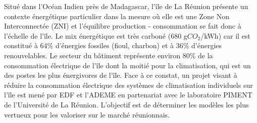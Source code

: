 {\normalsize
Situé dans l'Océan Indien près de Madagascar, l'île de La Réunion présente un contexte énergétique particulier dans la mesure où elle est une Zone Non Interconnectée (ZNI) et l'équilibre production - consommation se fait donc à l'échelle de l'île. Le mix énergétique est très carboné (680 g$\unit{CO_2}$/kWh) car il est constitué à 64\% d'énergies fossiles (fioul, charbon) et à 36\% d'énergies renouvelables. Le secteur du bâtiment représente environ 80\% de la consommation électrique de l'île dont la moitié pour la climatisation, qui est un des postes les plus énergivores de l'île. Face à ce constat, un projet visant à réduire la consommation électrique des systèmes de climatisation individuels sur l'île est mené par EDF et l'ADEME en partenariat avec le laboratoire PIMENT de l'Université de La Réunion. L'objectif est de déterminer les modèles les plus vertueux pour les valoriser sur le marché réunionnais.



}
